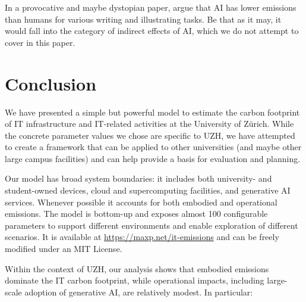 \documentclass[11pt]{article}
\begin{document}
In a provocative and maybe dystopian paper, \textcite{tomlinson:2024:carbon} argue that AI has lower emissions than humans for various writing and illustrating tasks. Be that as it may, it would fall into the category of indirect effects of AI, which we do not attempt to cover in this paper.

\section{Conclusion}

We have presented a simple but powerful model to estimate the carbon footprint of IT infrastructure and IT-related activities at the University of Zürich. While the concrete parameter values we chose are specific to UZH, we have attempted to create a framework that can be applied to other universities (and maybe other large campus facilities) and can help provide a basis for evaluation and planning.

Our model has broad system boundaries: it includes both university- and student-owned devices, cloud and supercomputing facilities, and generative AI services. Whenever possible it accounts for both embodied and operational emissions. The model is bottom-up and exposes almost 100 configurable parameters to support different environments and enable exploration of different scenarios. It is available at \url{https://maxp.net/it-emissions} and can be freely modified under an MIT License.

Within the context of UZH, our analysis shows that embodied emissions dominate the IT carbon footprint, while operational impacts, including large-scale adoption of generative AI, are relatively modest. In particular:
\end{document}
